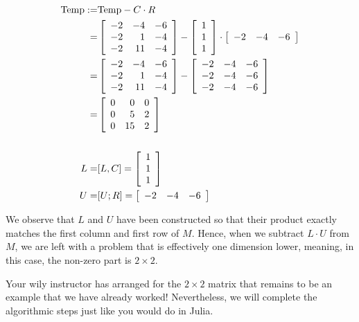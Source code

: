 \begin{align*}
    {\rm Temp}:=& {\rm Temp}-C \cdot R \\
    =& \left[\begin{array}{rrr} -2 & -4 & -6\\
-2 & 1 & -4 \\ -2 & 11 & -4 \end{array}\right] -   \left[\begin{array}{r} 1 \\ 1 \\1 \end{array} \right] \cdot  \left[\begin{array}{rrr} -2&-4 & -6 \end{array} \right] \\
=& \left[\begin{array}{rrr} -2 & -4 & -6\\
-2 & 1 & -4 \\ -2 & 11 & -4 \end{array}\right] -   \left[\begin{array}{rrr}  -2&-4 & -6 \\  -2&-4 & -6 \\  -2&-4 & -6\end{array} \right]  \\
=&  \left[\begin{array}{rrr} 0 & 0 & 0\\
0 & 5 & 2 \\ 0 & 15 & 2\end{array}\right]\\
\\
L=&[L,C] = \left[\begin{array}{r}  1 \\ 1 \\1 \end{array} \right]\\
U=&[U;R] = \left[\begin{array}{rrr}  -2&-4 & -6  \end{array} \right]
\end{align*}

\begin{tcolorbox}[sharp corners, colback=green!30, colframe=green!80!blue, title=\textbf{\large Reminder of Why LU Factorization Works: Peeling the Onion}]
We observe that $L$ and $U$ have been constructed so that their product exactly matches the first column and first row of $M$.  Hence, when we subtract $L \cdot U$ from $M$, we are left with a problem that is effectively one dimension lower, meaning, in this case, the non-zero part is $2 \times 2$. 
\end{tcolorbox}
Your wily instructor has arranged for the $2 \times 2$ matrix that remains to be an example that we have already worked! Nevertheless, we will complete the algorithmic steps just like you would do in Julia.\\

